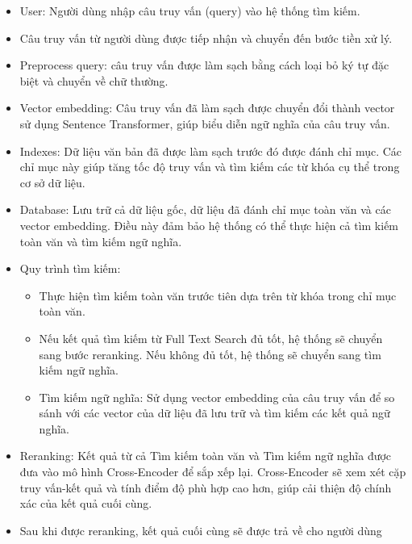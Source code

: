 \begin{itemize}
    \item User: Người dùng nhập câu truy vấn (query) vào hệ thống tìm kiếm.
    \item Câu truy vấn từ người dùng được tiếp nhận và chuyển đến bước tiền xử lý.
    \item  Preprocess query: câu truy vấn được làm sạch bằng cách loại bỏ ký tự đặc biệt và chuyển về chữ thường.
    \item Vector embedding: Câu truy vấn đã làm sạch được chuyển đổi thành vector sử dụng Sentence Transformer, giúp biểu diễn ngữ nghĩa của câu truy vấn.
    \item Indexes: Dữ liệu văn bản đã được làm sạch trước đó được đánh chỉ mục. Các chỉ mục này giúp tăng tốc độ truy vấn và tìm kiếm các từ khóa cụ thể trong cơ sở dữ liệu.
    \item Database: Lưu trữ cả dữ liệu gốc, dữ liệu đã đánh chỉ mục toàn văn và các vector embedding. Điều này đảm bảo hệ thống có thể thực hiện cả tìm kiếm toàn văn và tìm kiếm ngữ nghĩa.
    \item Quy trình tìm kiếm:
    \begin{itemize}
        \item Thực hiện tìm kiếm toàn văn trước tiên dựa trên từ khóa trong chỉ mục toàn văn. 
        \item  Nếu kết quả tìm kiếm từ Full Text Search đủ tốt, hệ thống sẽ chuyển sang bước reranking. Nếu không đủ tốt, hệ thống sẽ chuyển sang tìm kiếm ngữ nghĩa.
        \item Tìm kiếm ngữ nghĩa: Sử dụng vector embedding của câu truy vấn để so sánh với các vector của dữ liệu đã lưu trữ và tìm kiếm các kết quả ngữ nghĩa.
    \end{itemize}
    \item Reranking: Kết quả từ cả Tìm kiếm toàn văn và Tìm kiếm ngữ nghĩa được đưa vào mô hình Cross-Encoder để sắp xếp lại. Cross-Encoder sẽ xem xét cặp truy vấn-kết quả và tính điểm độ phù hợp cao hơn, giúp cải thiện độ chính xác của kết quả cuối cùng.
    \item Sau khi được reranking, kết quả cuối cùng sẽ được trả về cho người dùng
\end{itemize}
